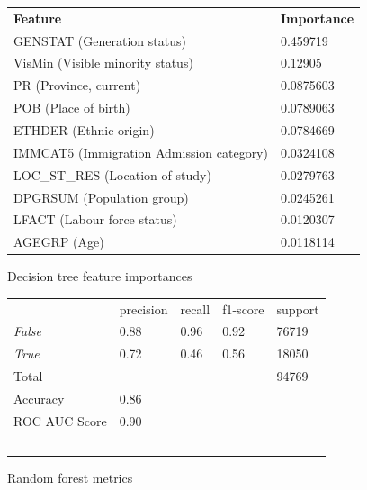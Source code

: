 \documentclass[10pt, conference, compsocconf]{IEEEtran}
\begin{document}
\begin{figure}
  \begin{tabular}{ll}
    \textbf{Feature}                          & \textbf{Importance} \\
    GENSTAT (Generation status)               & 0.459719 \\
    VisMin (Visible minority status)          & 0.12905 \\
    PR (Province, current)                    & 0.0875603 \\
    POB (Place of birth)                      & 0.0789063 \\
    ETHDER (Ethnic origin)                    & 0.0784669 \\
    IMMCAT5 (Immigration Admission category)  & 0.0324108 \\
    LOC\_ST\_RES (Location of study)          & 0.0279763 \\
    DPGRSUM (Population group)                & 0.0245261 \\
    LFACT (Labour force status)               & 0.0120307 \\
    AGEGRP (Age)                              & 0.0118114 \\   
  \end{tabular}
  \caption{Decision tree feature importances}
  \label{fig:decision_tree_importances}
\end{figure}

\begin{figure}
  \begin{tabular}{lllll}
                  & precision & recall      & f1-score  & support \\
  \textit{False}  & 0.88      & 0.96        & 0.92      & 76719 \\
  \textit{True}   & 0.72      & 0.46        & 0.56      & 18050 \\
  Total			      &           &             &           & 94769 \\
  Accuracy        & 0.86 \\
  ROC AUC Score	  & 0.90 \\\
  \end{tabular}
  \caption{Random forest metrics}
  \label{fig:random_forest_metrics}
\end{figure}
\end{document}
